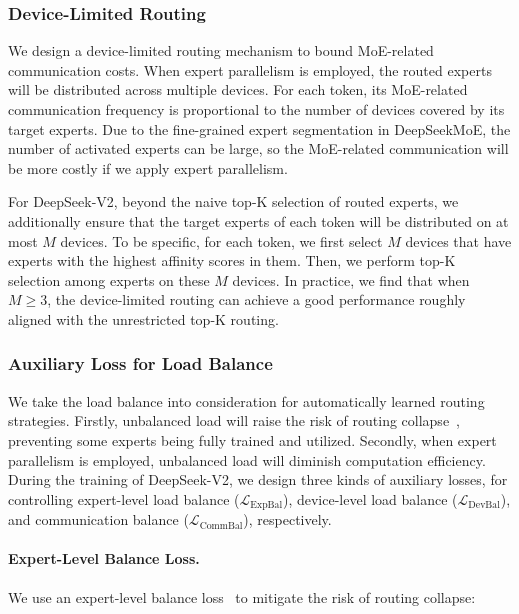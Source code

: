 \subsubsection{Device-Limited Routing}

We design a device-limited routing mechanism to bound MoE-related communication costs. When expert parallelism is employed, the routed experts will be distributed across multiple devices. For each token, its MoE-related communication frequency is proportional to the number of devices covered by its target experts. Due to the fine-grained expert segmentation in DeepSeekMoE, the number of activated experts can be large, so the MoE-related communication will be more costly if we apply expert parallelism. 

For DeepSeek-V2, beyond the naive top-K selection of routed experts, we additionally ensure that the target experts of each token will be distributed on at most $M$ devices. To be specific, for each token, we first select $M$ devices that have experts with the highest affinity scores in them. Then, we perform top-K selection among experts on these $M$ devices. In practice, we find that when $M \geqslant 3$, the device-limited routing can achieve a good performance roughly aligned with the unrestricted top-K routing. 

\subsubsection{Auxiliary Loss for Load Balance}

We take the load balance into consideration for automatically learned routing strategies. Firstly, unbalanced load will raise the risk of routing collapse~\citep{moe}, preventing some experts being fully trained and utilized. Secondly, when expert parallelism is employed, unbalanced load will diminish computation efficiency. During the training of DeepSeek-V2, we design three kinds of auxiliary losses, for controlling expert-level load balance ($\mathcal{L}_{\mathrm{ExpBal}}$), device-level load balance ($\mathcal{L}_{\mathrm{DevBal}}$), and communication balance ($\mathcal{L}_{\mathrm{CommBal}}$), respectively. 

\paragraph{Expert-Level Balance Loss.} We use an expert-level balance loss~\citep{switch,gshard} to mitigate the risk of routing collapse:

